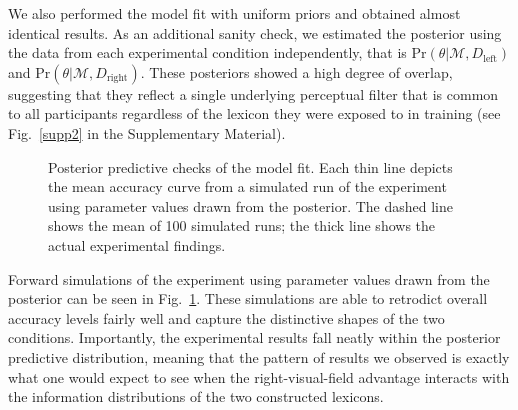 \documentclass[doc,biblatex,floatsintext]{apa7}
\begin{document}
We also performed the model fit with uniform priors and obtained almost identical results. As an additional sanity check, we estimated the posterior using the data from each experimental condition independently, that is $\mathrm{Pr}(\theta|\mathcal{M},D_\mathrm{left})$ and $\mathrm{Pr}(\theta|\mathcal{M},D_\mathrm{right})$. These posteriors showed a high degree of overlap, suggesting that they reflect a single underlying perceptual filter that is common to all participants regardless of the lexicon they were exposed to in training (see Fig.~\ref{supp2} in the Supplementary Material).

\begin{figure}
\vspace*{2pt}
\caption{Posterior predictive checks of the model fit. Each thin line depicts the mean accuracy curve from a simulated run of the experiment using parameter values drawn from the posterior. The dashed line shows the mean of 100 simulated runs; the thick line shows the actual experimental findings.}
\label{fig07}
\end{figure}

Forward simulations of the experiment using parameter values drawn from the posterior can be seen in Fig.~\ref{fig07}. These simulations are able to retrodict overall accuracy levels fairly well and capture the distinctive shapes of the two conditions. Importantly, the experimental results fall neatly within the posterior predictive distribution, meaning that the pattern of results we observed is exactly what one would expect to see when the right-visual-field advantage interacts with the information distributions of the two constructed lexicons.
\end{document}
